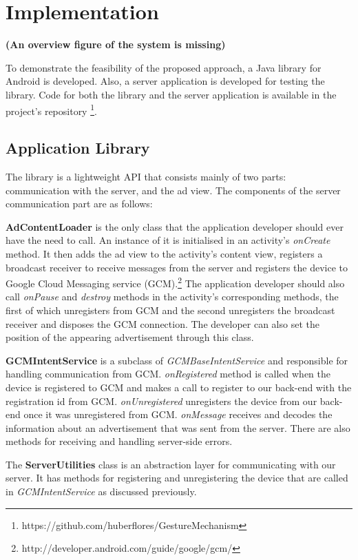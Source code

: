 \chapter{Implementation}

\textbf{(An overview figure of the system is missing)}

To demonstrate the feasibility of the proposed approach, a Java library for Android is developed. Also, a server application is developed for testing the library. Code for both the library and the server application is available in the project's repository \footnote{https://github.com/huberflores/GestureMechanism}.

\section{Application Library}

The library is a lightweight API that consists mainly of two parts: communication with the server,  and the ad view. The components of the server communication part are as follows:

\textbf{AdContentLoader} is the only class that the application developer should ever have the need to call. An instance of it is initialised in an activity's \textit{onCreate} method. It then adds the ad view to the activity's content view, registers a broadcast receiver to receive messages from the server and registers the device to Google Cloud Messaging service (GCM).\footnote{http://developer.android.com/guide/google/gcm/} The application developer should also call \textit{onPause} and \textit{destroy} methods in the activity's corresponding methods, the first of which unregisters from GCM and the second unregisters the broadcast receiver and disposes the GCM connection. The developer can also set the position of the appearing advertisement through this class.

\textbf{GCMIntentService} is a subclass of \textit{GCMBaseIntentService} and responsible for handling communication from GCM. \textit{onRegistered} method is called when the device is registered to GCM and makes a call to register to our back-end with the registration id from GCM. \textit{onUnregistered} unregisters the device from our back-end once it was unregistered from GCM. \textit{onMessage} receives and decodes the information about an advertisement that was sent from the server. There are also methods for receiving and handling server-side errors.

The \textbf{ServerUtilities} class is an abstraction layer for communicating with our server. It has methods for registering and unregistering the device that are called in \textit{GCMIntentService} as discussed previously.

